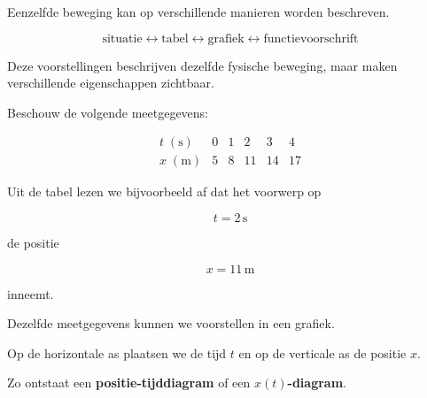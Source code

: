 \documentclass{ximera}
\begin{document}
Eenzelfde beweging kan op verschillende manieren worden beschreven.

\[
\boxed{
\text{situatie}
\longleftrightarrow
\text{tabel}
\longleftrightarrow
\text{grafiek}
\longleftrightarrow
\text{functievoorschrift}
}
\]

Deze voorstellingen beschrijven dezelfde fysische beweging, maar
maken verschillende eigenschappen zichtbaar.



Beschouw de volgende meetgegevens:

\[
\begin{array}{c|ccccc}
t\;(\mathrm{s}) & 0 & 1 & 2 & 3 & 4\\ \hline
x\;(\mathrm{m}) & 5 & 8 & 11 & 14 & 17
\end{array}
\]

Uit de tabel lezen we bijvoorbeeld af dat het voorwerp op

\[
t=2\,\mathrm{s}
\]

de positie

\[
x=11\,\mathrm{m}
\]

inneemt.



Dezelfde meetgegevens kunnen we voorstellen in een grafiek.


Op de horizontale as plaatsen we de tijd $t$ en op de verticale as
de positie $x$.

Zo ontstaat een \textbf{positie-tijddiagram} of een
\textbf{$x(t)$-diagram}.

\begin{image}[0.5\textwidth]
\end{image}
\end{document}

